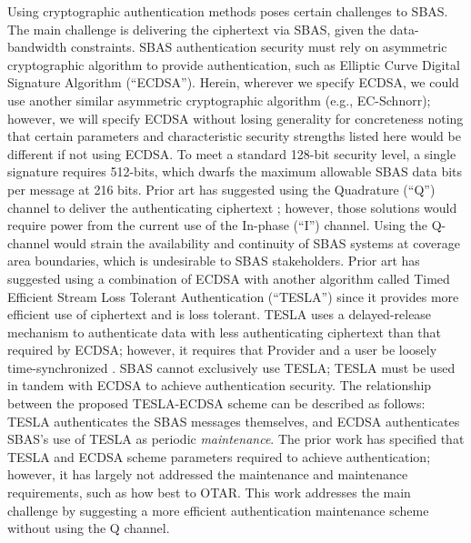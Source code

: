 \documentclass[letterpaper,times]{IONconf/IONconf}
\begin{document}
Using cryptographic authentication methods poses certain challenges to SBAS.
The main challenge is delivering the ciphertext via SBAS, given the data-bandwidth constraints.
SBAS authentication security must rely on asymmetric cryptographic algorithm to provide authentication, such as Elliptic Curve Digital Signature Algorithm (``ECDSA'').
Herein, wherever we specify ECDSA, we could use another similar asymmetric cryptographic algorithm (e.g., EC-Schnorr); however, we will specify ECDSA without losing generality for concreteness noting that certain parameters and characteristic security strengths listed here would be different if not using ECDSA.
To meet a standard 128-bit security level, a single signature requires 512-bits, which dwarfs the maximum allowable SBAS data bits per message at 216 bits.
Prior art has suggested using the Quadrature (``Q'') channel to deliver the authenticating ciphertext \cite{other_schemes}; however, those solutions would require power from the current use of the In-phase (``I'') channel.
Using the Q-channel would strain the availability and continuity of SBAS systems at coverage area boundaries, which is undesirable to SBAS stakeholders.
Prior art has suggested using a combination of ECDSA with another algorithm called Timed Efficient Stream Loss Tolerant Authentication (``TESLA'') \cite{Neish_Dissertation} since it provides more efficient use of ciphertext and is loss tolerant.
TESLA uses a delayed-release mechanism to authenticate data with less authenticating ciphertext than that required by ECDSA; however, it requires that Provider and a user be loosely time-synchronized \cite{perrig2005timed}.
SBAS cannot exclusively use TESLA; TESLA must be used in tandem with ECDSA to achieve authentication security.
The relationship between the proposed TESLA-ECDSA scheme can be described as follows: TESLA authenticates the SBAS messages themselves, and ECDSA authenticates SBAS's use of TESLA as periodic {\em maintenance}.
The prior work has specified that TESLA and ECDSA scheme parameters required to achieve authentication; however, it has largely not addressed the maintenance and maintenance requirements, such as how best to OTAR.
This work addresses the main challenge by suggesting a more efficient authentication maintenance scheme without using the Q channel.
\end{document}
